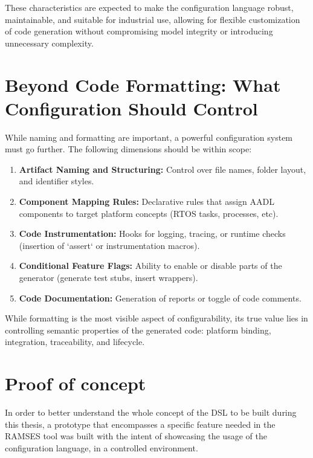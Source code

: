 These characteristics are expected to make the configuration language robust, maintainable, and suitable for industrial use, allowing for flexible customization of code generation without compromising model integrity or introducing unnecessary complexity.

\section{Beyond Code Formatting: What Configuration Should Control}
\label{sec:config_scope}

While naming and formatting are important, a powerful configuration system must go further. The following dimensions should be within scope:

\begin{enumerate}
	\item \textbf{Artifact Naming and Structuring:} Control over file names, folder layout, and \gls{identifier} styles.
	\item \textbf{Component Mapping Rules:} Declarative rules that assign \gls{AADL} components to target platform concepts (RTOS tasks, processes, etc).
	\item \textbf{Code Instrumentation:} Hooks for logging, tracing, or runtime checks (insertion of `assert` or instrumentation macros).
	\item \textbf{Conditional Feature Flags:} Ability to enable or disable parts of the generator (generate test stubs, insert wrappers).
	\item \textbf{Code Documentation:} Generation of reports or toggle of code comments.
\end{enumerate}

\begin{tcolorbox}[colback=green!5, colframe=green!50!black, title=Configuration is More Than Style]
	While formatting is the most visible aspect of configurability, its true value lies in controlling semantic properties of the generated code: platform binding, integration, traceability, and lifecycle.
\end{tcolorbox}

\section{Proof of concept}
\label{sec:proof_of_concept}

In order to better understand the whole concept of the \gls{DSL} to be built during this thesis, a prototype that encompasses a specific feature needed in the \gls{RAMSES} tool was built with the intent of showcasing the usage of the configuration language, in a controlled environment.

